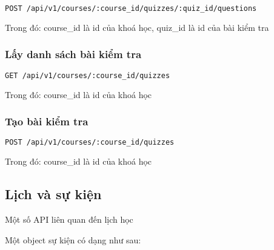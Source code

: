 \documentclass[../Thesis.tex]{subfiles}
\begin{document}
            \begin{lstlisting}[language=bash]
                POST /api/v1/courses/:course_id/quizzes/:quiz_id/questions
            \end{lstlisting}

            Trong đó: course\_id là id của khoá học, quiz\_id là id của bài kiểm tra

            \subsubsection{Lấy danh sách bài kiểm tra}
            \begin{lstlisting}[language=bash]
                GET /api/v1/courses/:course_id/quizzes
            \end{lstlisting}

            Trong đó: course\_id là id của khoá học

            \subsubsection{Tạo bài kiểm tra}

            \begin{lstlisting}[language=bash]
                POST /api/v1/courses/:course_id/quizzes
            \end{lstlisting}

            Trong đó: course\_id là id của khoá học

    \subsection{Lịch và sự kiện}
        Một số API liên quan đến lịch học

        Một object sự kiện có dạng như sau:
\end{document}
